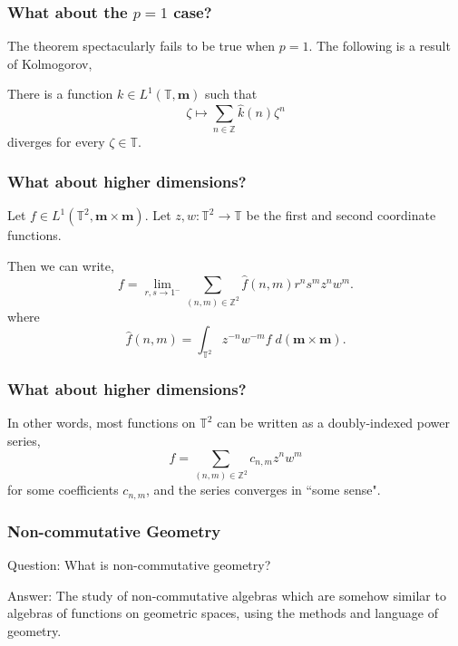 \documentclass{beamer}
\newcommand{\Circ}{\mathbb{T}}
\newcommand{\Itgr}{\mathbb{Z}}
\newcommand{\ha}{\boldsymbol{m}}
\begin{document}
\begin{frame}
    \frametitle{What about the $p = 1$ case?}
    The theorem spectacularly fails to be true when $p=1$.
    The following is a result of Kolmogorov,
    \begin{theorem}
        There is a function $k \in L^1(\Circ,\ha)$ such that
        \begin{equation*}
            \zeta \mapsto \sum_{n\in\Itgr} \widehat{k}(n)\zeta^n
        \end{equation*}
        diverges for every $\zeta \in \Circ$.
    \end{theorem}
\end{frame}

\begin{frame}
    \frametitle{What about higher dimensions?}
    Let $f \in L^1(\Circ^2,\ha\times\ha)$. 
    Let $z,w:\Circ^2\rightarrow\Circ$ be the first and second coordinate functions.
    
    Then we can write,
    \begin{equation*}
        f = \lim_{r,s\rightarrow 1^-} \sum_{(n,m) \in \Itgr^2} \widehat{f}(n,m)r^ns^mz^nw^m.
    \end{equation*}
    where
    \begin{equation*}
        \widehat{f}(n,m) = \int_{\Circ^2} z^{-n}w^{-m} f\;d(\ha\times\ha).
    \end{equation*}
\end{frame}

\begin{frame}
    \frametitle{What about higher dimensions?}
    In other words, most functions on $\Circ^2$ can be written as a doubly-indexed
    power series,
    \begin{equation*}
        f = \sum_{(n,m) \in \Itgr^2} c_{n,m} z^nw^m
    \end{equation*}
    for some  coefficients $c_{n,m}$, and the series converges
    in ``some sense".
\end{frame}


\begin{frame}
    \frametitle{Non-commutative Geometry}
    Question: What is non-commutative geometry?
    
    \begin{block}
        {Answer:}   
            The study of non-commutative algebras which are somehow similar
            to algebras of functions on geometric spaces, using the methods
            and language of geometry.
    \end{block}
\end{frame}
\end{document}
